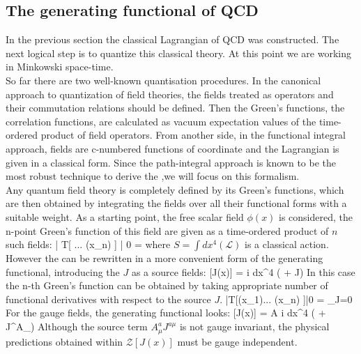 	\subsection*{The generating functional of QCD}
	In the previous section the classical Lagrangian of QCD \Eq{\ref{qcd_low:L_QCD}} was constructed. The next logical step is to quantize this classical theory. At this point we are working in Minkowski space-time.\\
	
	So far there are two well-known quantisation procedures. In the canonical approach to quantization of field theories, the fields treated as operators and their commutation relations should be defined. Then the Green's functions, the correlation functions, are calculated as vacuum expectation values of the time-ordered product of field operators. From another side, in the functional integral approach, fields are c-numbered functions of coordinate and the Lagrangian is given in a classical form. Since the path-integral approach is known to be the most robust technique to derive the \DS ,we will focus on this formalism.   \\

Any quantum field theory is completely defined by its Green's functions, which are then obtained by integrating the fields over all their functional forms with a suitable weight. As a starting point, the free scalar field $\phi(x)$ is considered, the n-point Green's function of this field are given as a time-ordered product of $n$ such fields: 
	\beqa
		\label{qcd_low:Green_func}
		 | T[ ... \hat \phi(x_n) ] | 0 \rangle  = 
	\eeqa
where $S=\int dx^4( \mathcal{L} )$ is a classical action. However the \Eq{\ref{qcd_low:Green_func}} can be rewritten in a more convenient form of the generating functional, introducing the $J$ as a source fields:
    \beqa
        \label{qcd_low:Gen_functional_scal}
         [J(x)] = \int {} \phi \;  \left\lbrace i \int dx^4 (   + J\phi)\right\rbrace 
    \eeqa
In this case the n-th Green's function can be obtained by taking appropriate number of functional derivatives with respect to the source $J$. 
    \beqa
         |T[\hat \phi(x_1)... \hat \phi(x_n) ]|0 \rangle =   \vert_{J=0}
   \eeqa
For the gauge fields, the generating functional looks:
    \beqa
    	\label{qcd_low:Gen_functional_vec}
        [J(x)] = \int {} A \;  \left\lbrace i \int dx^4 (   + J^\mu A_\mu )\right\rbrace 
    \eeqa
Although the source term $A^a_\mu J^{a \mu}$ is not gauge invariant, the physical predictions obtained within $\mathcal{Z}[J(x)]$ must be gauge independent. \\

